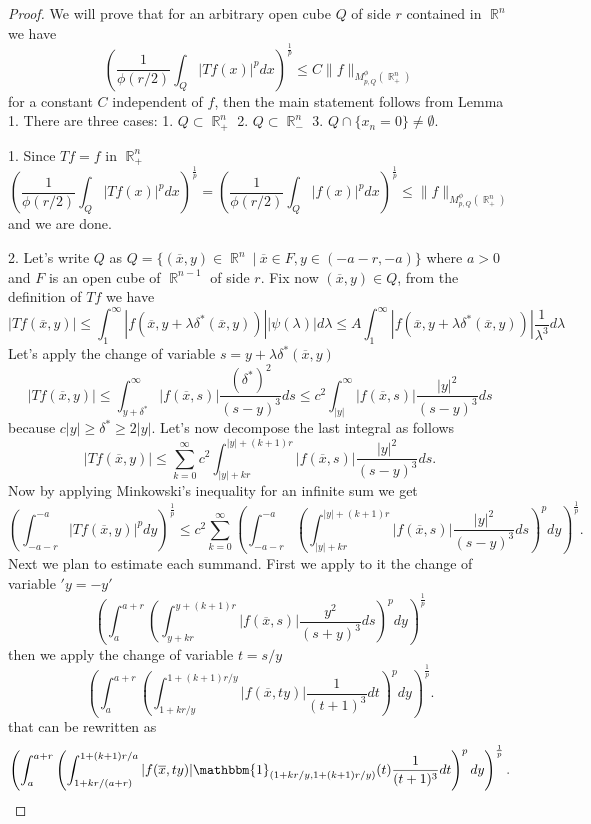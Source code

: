 \documentclass[12pt]{article}
\theoremstyle{definition}
\DeclareMathOperator\rr{\mathbb{R}}
\begin{document}
\begin{proof}
We will prove that for an arbitrary open cube $Q$ of side $r$ contained in $\rr^n$ we have
\begin{equation}
\left(\frac{1}{\phi(r/2)}\int_Q |Tf(x)|^pdx \right)^{\frac{1}{p}} \le C \| f\|_{M_{p,Q}^\phi(\rr^n_+)}
\end{equation}
for a constant $C$ independent of $f$, then the main statement follows from Lemma 1. There are three cases: 1. $Q \subset \rr^n_+$ 2. $Q \subset \rr^n_-$ 3. $Q\cap \{x_n=0\} \neq \emptyset.$ 

1. Since $Tf=f$ in $\rr^n_+$
\[ \left(\frac{1}{\phi(r/2)}\int_Q |Tf(x)|^pdx \right)^{\frac{1}{p}}=\left(\frac{1}{\phi(r/2)}\int_Q |f(x)|^pdx \right)^{\frac{1}{p}} \le  \| f\|_{M_{p,Q}^\phi(\rr^n_+)}\]
and we are done.

2. Let's write $Q$ as $Q=\{ (\overline x,y) \in \rr^n \ | \ \overline x \in F, y \in (-a-r,-a) \}$ where $a>0$ and $F$ is an open cube of $\rr^{n-1}$ of side $r$. Fix now $(\overline x, y) \in Q$, from the definition of $Tf$ we have
\[ |Tf(\overline x,y)|\le\int_1^\infty |f(\overline x, y+\lambda \delta^*(\overline x,y))||\psi(\lambda)|d\lambda \le A \int_1^\infty |f(\overline x, y+\lambda \delta^*(\overline x,y))|\frac{1}{\lambda^3}d\lambda\]
Let's apply the change of variable $s=y+\lambda \delta^*(\overline x,y)$
\[ |Tf(\overline x,y)|\le\int_{y+\delta^*}^\infty |f(\overline x, s)|\frac{(\delta^*)^2}{(s-y)^3}ds\le c^2 \int_{|y|}^\infty |f(\overline x, s)|\frac{|y|^2}{(s-y)^3}ds\]
because $c|y|\ge\delta^*\ge 2|y|.$ Let's now decompose the last integral as follows
\[ |Tf(\overline x,y)|\le \sum_{k=0}^\infty c^2\int_{|y|+kr}^{|y|+(k+1)r} |f(\overline x, s)|\frac{|y|^2}{(s-y)^3}ds.\]
Now by applying Minkowski's inequality for an infinite sum we get
\[ \left(\int_{-a-r}^{-a}|Tf(\overline x,y)|^p dy\right)^{\frac{1}{p}}\le  c^2\sum_{k=0}^\infty \left( \int_{-a-r}^{-a}\left ( \int_{|y|+kr}^{|y|+(k+1)r} |f(\overline x, s) |\frac{|y|^2}{(s-y)^3}ds\right)^pdy \right)^{\frac{1}{p}}.\]
Next we plan to estimate each summand. First we apply to it the change of variable $'y=-y'$ 
\[ \left( \int_{a}^{a+r}\left (\int_{y+kr}^{y+(k+1)r} |f(\overline x, s)|\frac{y^2}{(s+y)^3}ds\right)^pdy \right)^{\frac{1}{p}}\]
then we apply the change of variable $t=s/y$
\[ \left( \int_{a}^{a+r}\left (\int_{1+kr/y}^{1+(k+1)r/y} |f(\overline x, ty)|\frac{1}{(t+1)^3}dt\right)^pdy \right)^{\frac{1}{p}}.\]
that can be rewritten as
 \[  \left( \int_{a}^{a+r}\left (\int_{1+kr/(a+r)}^{1+(k+1)r/a} |f(\overline x, ty)|\mathbbm{1}_{(1+kr/y,  1+(k+1)r/y ) }(t)\frac{1}{(t+1)^3}dt\right)^pdy \right)^{\frac{1}{p}}.\]

\end{proof}
\end{document}
